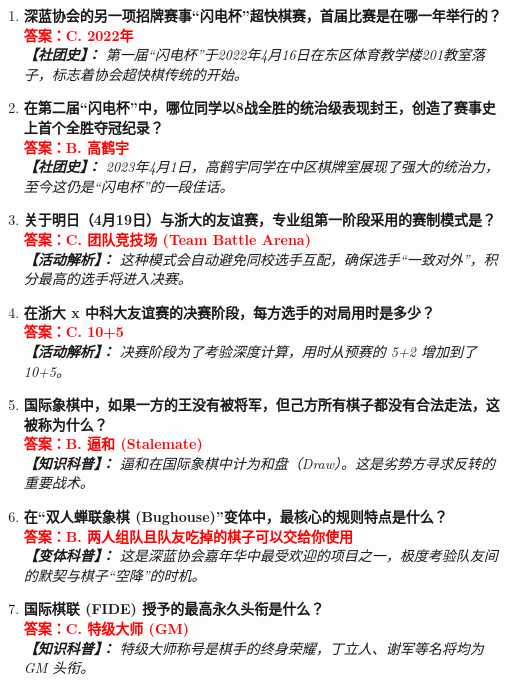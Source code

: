 \documentclass[a4paper, 11pt]{ctexart}
\begin{document}
\begin{enumerate}[label=\arabic*., itemsep=1.5em]
\item \textbf{深蓝协会的另一项招牌赛事“闪电杯”超快棋赛，首届比赛是在哪一年举行的？} \\
    \textcolor{red}{\textbf{答案：C. 2022年}} \\
    \textit{\textbf{【社团史】：} 第一届“闪电杯”于2022年4月16日在东区体育教学楼201教室落子，标志着协会超快棋传统的开始。}

    \item \textbf{在第二届“闪电杯”中，哪位同学以8战全胜的统治级表现封王，创造了赛事史上首个全胜夺冠纪录？} \\
    \textcolor{red}{\textbf{答案：B. 高鹤宇}} \\
    \textit{\textbf{【社团史】：} 2023年4月1日，高鹤宇同学在中区棋牌室展现了强大的统治力，至今这仍是“闪电杯”的一段佳话。}

    \item \textbf{关于明日（4月19日）与浙大的友谊赛，专业组第一阶段采用的赛制模式是？} \\
    \textcolor{red}{\textbf{答案：C. 团队竞技场 (Team Battle Arena)}} \\
    \textit{\textbf{【活动解析】：} 这种模式会自动避免同校选手互配，确保选手“一致对外”，积分最高的选手将进入决赛。}

    \item \textbf{在浙大 x 中科大友谊赛的决赛阶段，每方选手的对局用时是多少？} \\
    \textcolor{red}{\textbf{答案：C. 10+5}} \\
    \textit{\textbf{【活动解析】：} 决赛阶段为了考验深度计算，用时从预赛的 5+2 增加到了 10+5。}

    \item \textbf{国际象棋中，如果一方的王没有被将军，但己方所有棋子都没有合法走法，这被称为什么？} \\
    \textcolor{red}{\textbf{答案：B. 逼和 (Stalemate)}} \\
    \textit{\textbf{【知识科普】：} 逼和在国际象棋中计为和盘（Draw）。这是劣势方寻求反转的重要战术。}

    \item \textbf{在“双人蝉联象棋 (Bughouse)”变体中，最核心的规则特点是什么？} \\
    \textcolor{red}{\textbf{答案：B. 两人组队且队友吃掉的棋子可以交给你使用}} \\
    \textit{\textbf{【变体科普】：} 这是深蓝协会嘉年华中最受欢迎的项目之一，极度考验队友间的默契与棋子“空降”的时机。}

    \item \textbf{国际棋联 (FIDE) 授予的最高永久头衔是什么？} \\
    \textcolor{red}{\textbf{答案：C. 特级大师 (GM)}} \\
    \textit{\textbf{【知识科普】：} 特级大师称号是棋手的终身荣耀，丁立人、谢军等名将均为 GM 头衔。}


\end{enumerate}
\end{document}
